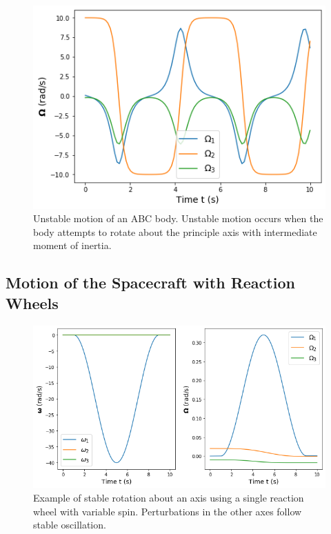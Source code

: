 \documentclass[12]{article}
\begin{document}
\begin{multicols*}{2}
\begin{figure}[H]
\centering
\includegraphics[width=0.9\linewidth]{fig/no_actuation_ABC_unstable.png}
\vspace{-0.3cm}
\caption{\label{fig:no_actuation_ABC_unstable}Unstable motion of an ABC body. Unstable motion occurs when the body attempts to rotate about the principle axis with intermediate moment of inertia.}
\end{figure}

\vfill\null
\columnbreak

\subsection{Motion of the Spacecraft with Reaction Wheels}

\begin{figure}[H]
\centering
\includegraphics[width=\linewidth]{fig/reaction_single_zero_stable.png}
\vspace{-0.3cm}
\caption{\label{fig:reaction_single_zero_stable}Example of stable rotation about an axis using a single reaction wheel with variable spin. Perturbations in the other axes follow stable oscillation.}
\end{figure}


\end{multicols*}
\end{document}
